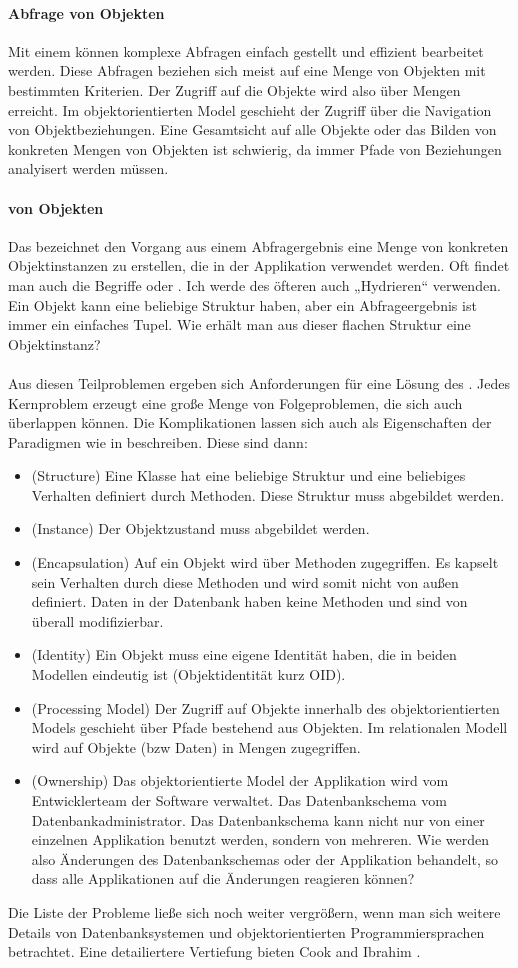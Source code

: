 \paragraph{Abfrage von Objekten}
Mit einem \RDBMS können komplexe Abfragen einfach gestellt und effizient bearbeitet werden. Diese Abfragen beziehen sich meist auf eine Menge von Objekten mit bestimmten Kriterien. Der Zugriff auf die Objekte wird also über Mengen erreicht. Im objektorientierten Model geschieht der Zugriff über die Navigation von Objektbeziehungen. Eine Gesamtsicht auf alle Objekte oder das Bilden von konkreten Mengen von Objekten ist schwierig, da immer Pfade von Beziehungen analyisert werden müssen.

\paragraph{ von Objekten}
Das  bezeichnet den Vorgang aus einem Abfragergebnis eine Menge von konkreten Objektinstanzen zu erstellen, die in der Applikation verwendet werden. Oft findet man auch die Begriffe  oder . Ich werde des öfteren auch „Hydrieren“ verwenden. Ein Objekt kann eine beliebige Struktur haben, aber ein Abfrageergebnis ist immer ein einfaches Tupel. Wie erhält man aus dieser flachen Struktur eine Objektinstanz?\\
\\
Aus diesen Teilproblemen ergeben sich Anforderungen für eine Lösung des . Jedes Kernproblem erzeugt eine große Menge von Folgeproblemen, die sich auch überlappen können. Die Komplikationen lassen sich auch als Eigenschaften der Paradigmen wie in \cite[S. 38]{classification} beschreiben. Diese sind dann:
\begin{itemize}
\item (Structure) Eine Klasse hat eine beliebige Struktur und eine beliebiges Verhalten definiert durch Methoden. Diese Struktur muss abgebildet werden.
\item (Instance) Der Objektzustand muss abgebildet werden.
\item (Encapsulation) Auf ein Objekt wird über Methoden zugegriffen. Es kapselt sein Verhalten durch diese Methoden und wird somit nicht von außen definiert. Daten in der Datenbank haben keine Methoden und sind von überall modifizierbar.
\item (Identity) Ein Objekt muss eine eigene Identität haben, die in beiden Modellen eindeutig ist (Objektidentität kurz OID).
\item (Processing Model) Der Zugriff auf Objekte innerhalb des objektorientierten Models geschieht über Pfade bestehend aus Objekten. Im relationalen Modell wird auf Objekte (bzw Daten) in Mengen zugegriffen.
\item (Ownership) Das objektorientierte Model der Applikation wird vom Entwicklerteam der Software verwaltet. Das Datenbankschema vom Datenbankadministrator. Das Datenbankschema kann nicht nur von einer einzelnen Applikation benutzt werden, sondern von mehreren. Wie werden also Änderungen des Datenbankschemas oder der Applikation behandelt, so dass alle Applikationen auf die Änderungen reagieren können?
\end{itemize}
Die Liste der Probleme ließe sich noch weiter vergrößern, wenn man sich weitere Details von Datenbanksystemen und objektorientierten Programmiersprachen betrachtet. Eine detailiertere Vertiefung bieten Cook and Ibrahim \cite{cook-whats-the-problem}.\\
